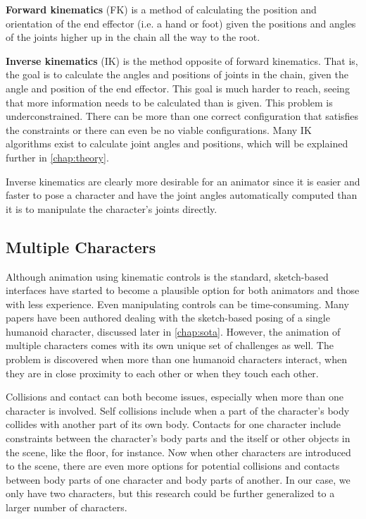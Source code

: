 \textbf{Forward kinematics} (FK) is a method of calculating the position and orientation of the end effector (i.e. a hand or foot) given the positions and angles of the joints higher up in the chain all the way to the root. 

\textbf{Inverse kinematics} (IK) is the method opposite of forward kinematics. That is, the goal is to calculate the angles and positions of joints in the chain, given the angle and position of the end effector. This goal is much harder to reach, seeing that more information needs to be calculated than is given. This problem is underconstrained. There can be more than one correct configuration that satisfies the constraints or there can even be no viable configurations. Many IK algorithms exist to calculate joint angles and positions, which will be explained further in \autoref{chap:theory}.

Inverse kinematics are clearly more desirable for an animator since it is easier and faster to pose a character and have the joint angles automatically computed than it is to manipulate the character's joints directly.

\subsection{Multiple Characters}
Although animation using kinematic controls is the standard, sketch-based interfaces have started to become a plausible option for both animators and those with less experience. Even manipulating controls can be time-consuming. Many papers have been authored dealing with the sketch-based posing of a single humanoid character, discussed later in \autoref{chap:sota}. However, the animation of multiple characters comes with its own unique set of challenges as well. The problem is discovered when more than one humanoid characters interact, when they are in close proximity to each other or when they touch each other.

Collisions and contact can both become issues, especially when more than one character is involved. Self collisions include when a part of the character's body collides with another part of its own body. Contacts for one character include constraints between the character's body parts and the itself or other objects in the scene, like the floor, for instance. Now when other characters are introduced to the scene, there are even more options for potential collisions and contacts between body parts of one character and body parts of another. In our case, we only have two characters, but this research could be further generalized to a larger number of characters.

